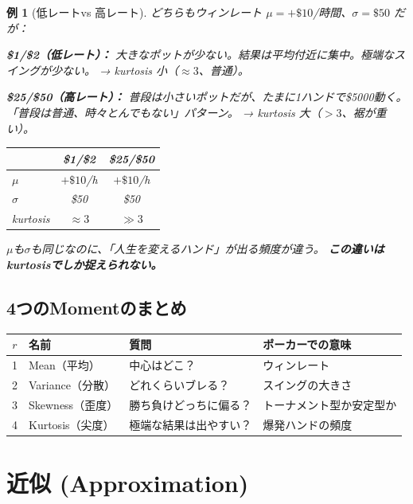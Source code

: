 \documentclass{article}
\newtheorem{example}{例}[section]
\theoremstyle{remark}
\begin{document}
\begin{example}[低レートvs 高レート]
  どちらもウィンレート $\mu = +\$10$/時間、$\sigma = \$50$ だが：

  \textbf{\$1/\$2（低レート）：}
  大きなポットが少ない。結果は平均付近に集中。極端なスイングが少ない。
  → kurtosis 小（$\approx 3$、普通）。

  \textbf{\$25/\$50（高レート）：}
  普段は小さいポットだが、たまに1ハンドで\$5000動く。
  「普段は普通、時々とんでもない」パターン。
  → kurtosis 大（$> 3$、裾が重い）。

  \begin{center}
    \begin{tabular}{lcc}
      \toprule
      & \$1/\$2 & \$25/\$50 \\ \midrule
      $\mu$ & $+\$10$/h & $+\$10$/h \\
      $\sigma$ & \$50 & \$50 \\
      kurtosis & $\approx 3$ & $\gg 3$ \\
      \bottomrule
    \end{tabular}
  \end{center}

  $\mu$も$\sigma$も同じなのに、「人生を変えるハンド」が出る頻度が違う。
  \textbf{この違いはkurtosisでしか捉えられない。}
\end{example}

\subsection{4つのMomentのまとめ}

\begin{center}
\renewcommand{\arraystretch}{1.3}
\begin{tabular}{clll}
  \toprule
  $r$ & \textbf{名前} & \textbf{質問} & \textbf{ポーカーでの意味} \\ \midrule
  1 & Mean（平均） & 中心はどこ？ & ウィンレート \\
  2 & Variance（分散） & どれくらいブレる？ & スイングの大きさ \\
  3 & Skewness（歪度） & 勝ち負けどっちに偏る？ & トーナメント型か安定型か \\
  4 & Kurtosis（尖度） & 極端な結果は出やすい？ & 爆発ハンドの頻度 \\
  \bottomrule
\end{tabular}
\end{center}

\section{近似 (Approximation)}
\end{document}
